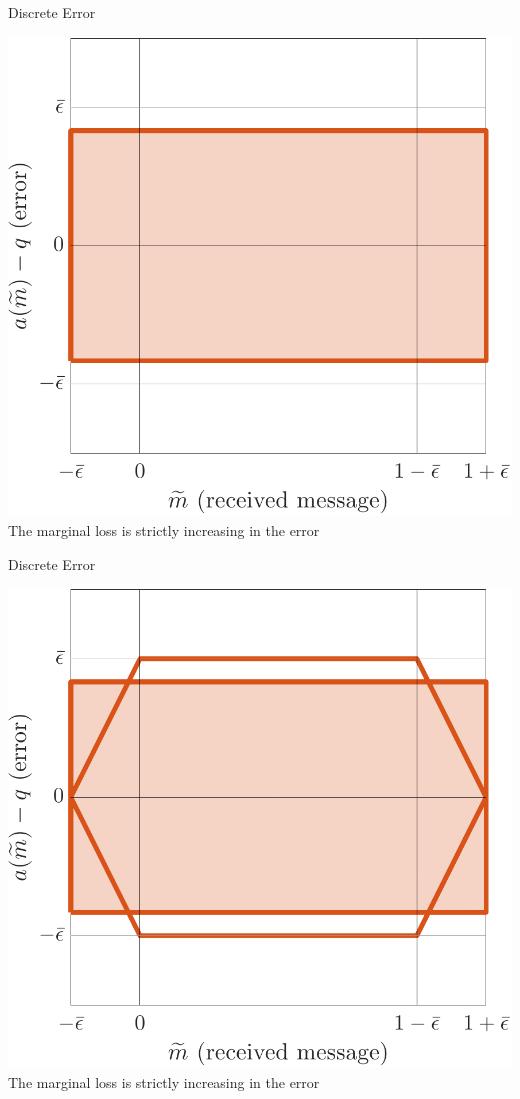 \documentclass[hyperref={colorlinks=true,linkcolor=blue,citecolor=blue}]{beamer}
\begin{document}
\begin{frame}{Discrete Error}
\begin{center}
\includegraphics[scale=.45]{DiscreteError}\\
The marginal loss is strictly increasing in the error
\end{center}
\end{frame}

\begin{frame}{Discrete Error}
\begin{center}
\includegraphics[scale=.45]{BothError}\\
The marginal loss is strictly increasing in the error
\end{center}
\end{frame}
\end{document}
